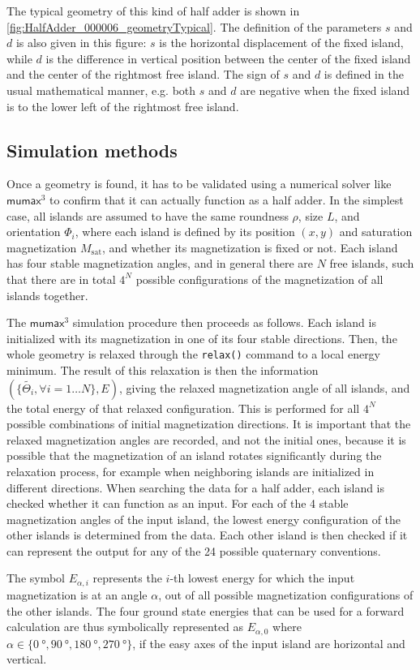 \documentclass[11pt,a4paper,english,twoside]{article}
\newcommand{\code}[1]{\texttt{#1}}
\newcommand{\mumax}{$\mathsf{mumax}^3$}
\begin{document}
The typical geometry of this kind of half adder is shown in \cref{fig:HalfAdder_000006_geometryTypical}. The definition of the parameters $s$ and $d$ is also given in this figure: $s$ is the horizontal displacement of the fixed island, while $d$ is the difference in vertical position between the center of the fixed island and the center of the rightmost free island. The sign of $s$ and $d$ is defined in the usual mathematical manner, e.g. both $s$ and $d$ are negative when the fixed island is to the lower left of the rightmost free island. \par 

\subsection{Simulation methods}
Once a geometry is found, it has to be validated using a numerical solver like \mumax{} to confirm that it can actually function as a half adder. In the simplest case, all islands are assumed to have the same roundness $\rho$, size $L$, and orientation $\Phi_i$, where each island is defined by its position $(x,y)$ and saturation magnetization $M_\mathrm{sat}$, and whether its magnetization is fixed or not. Each island has four stable magnetization angles, and in general there are $N$ free islands, such that there are in total $4^N$ possible configurations of the magnetization of all islands together. \par
The \mumax{} simulation procedure then proceeds as follows. Each island is initialized with its magnetization in one of its four stable directions. Then, the whole geometry is relaxed through the \code{relax()} command to a local energy minimum. The result of this relaxation is then the information $(\{\widetilde{\Theta_i}, \forall i=1\dots N\}, E)$, giving the relaxed magnetization angle of all islands, and the total energy of that relaxed configuration. This is performed for all $4^N$ possible combinations of initial magnetization directions. It is important that the relaxed magnetization angles are recorded, and not the initial ones, because it is possible that the magnetization of an island rotates significantly during the relaxation process, for example when neighboring islands are initialized in different directions. When searching the data for a half adder, each island is checked whether it can function as an input. For each of the 4 stable magnetization angles of the input island, the lowest energy configuration of the other islands is determined from the data. Each other island is then checked if it can represent the output for any of the 24 possible quaternary conventions. \par
The symbol $E_{\alpha,i}$ represents the $i$-th lowest energy for which the input magnetization is at an angle $\alpha$, out of all possible magnetization configurations of the other islands. The four ground state energies that can be used for a forward calculation are thus symbolically represented as $E_{\alpha,0}$ where $\alpha \in \{ \SI{0}{\degree}, \SI{90}{\degree}, \SI{180}{\degree}, \SI{270}{\degree} \}$, if the easy axes of the input island are horizontal and vertical.
\end{document}
